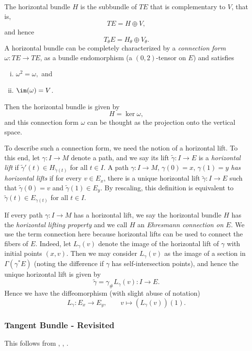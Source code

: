 The horizontal bundle $H$ is the subbundle of $TE$ that is complementary to $V$, that is,
$$TE=H\oplus V,$$
and hence
$$T_\theta E=H_\theta\oplus V_\theta.$$
A horizontal bundle can be completely characterized by a \textit{connection form} $\omega:TE\to TE$, as a bundle endomorphism (a $(0,2)$-tensor on $E$) and satisfies
\begin{enumerate}[i.]
	\item $\omega^2=\omega,$ and
	\item $\im(\omega)=V$.	
\end{enumerate}
Then the horizontal bundle is given by
$$H=\ker{\omega},$$
and this connection form $\omega$ can be thought as the projection onto the vertical space.

To describe such a connection form, we need the notion of a horizontal lift.  To this end, let $\gamma:I\to M$ denote a path, and we say its lift $\tilde{\gamma}:I\to E$ is a \textit{horizontal lift} if $\tilde{\gamma}'(t)\in H_{\tilde{\gamma}(t)}$ for all $t\in I$.  A path $\gamma:I\to M$, $\gamma(0)=x$, $\gamma(1)=y$ \textit{has horizontal lifts} if for every $v\in E_x$, there is a unique horizontal lift $\tilde{\gamma}:I\to E$ such that $\tilde{\gamma}(0)=v$ and $\tilde{\gamma}(1)\in E_y$.  By rescaling, this definition is equivalent to $\tilde{\gamma}(t)\in E_{\gamma(t)}$ for all $t\in I$.


If every path $\gamma:I\to M$ has a horizontal lift, we say the horizontal bundle $H$ has the \textit{horizontal lifting property} and we call $H$ an \textit{Ehresmann connection on $E$}.  We use the term connection here because horizontal lifts can be used to connect the fibers of $E$.  Indeed, let $L_\gamma(v)$ denote the image of the horizontal lift of $\gamma$ with initial points $(x,v)$.  Then we may consider $L_\gamma(v)$ as the image of a section in $\Gamma(\gamma^*E)$ (noting the difference if $\gamma$ has self-intersection points), and hence the unique horizontal lift is given by
$$\tilde{\gamma}=\gamma_\#L_\gamma(v):I\to E.$$
Hence we have the diffeomorphism (with slight abuse of notation)
$$L_\gamma:E_x\to E_y,\qquad v\mapsto (L_\gamma(v))(1).$$





\subsubsection{Tangent Bundle - Revisited}

\begin{tcolorbox}
This follows from \cite{paternain2012geodesic}, \cite{ryan2014geometry}, \cite{sakai1996riemannian}.
\end{tcolorbox}



